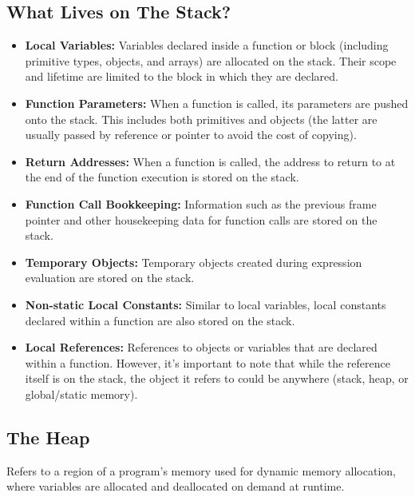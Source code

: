 \documentclass{report}
\begin{document}
    \bigbreak \noindent 
    \subsection{What Lives on The Stack?}
    \bigbreak \noindent 
    \begin{itemize}
        \item \textbf{Local Variables:} Variables declared inside a function or block (including primitive types, objects, and arrays) are allocated on the stack. Their scope and lifetime are limited to the block in which they are declared.
        \item \textbf{Function Parameters:} When a function is called, its parameters are pushed onto the stack. This includes both primitives and objects (the latter are usually passed by reference or pointer to avoid the cost of copying).
        \item \textbf{Return Addresses:} When a function is called, the address to return to at the end of the function execution is stored on the stack.
        \item \textbf{Function Call Bookkeeping:} Information such as the previous frame pointer and other housekeeping data for function calls are stored on the stack.
        \item \textbf{Temporary Objects:} Temporary objects created during expression evaluation are stored on the stack.
        \item \textbf{Non-static Local Constants:} Similar to local variables, local constants declared within a function are also stored on the stack.
        \item \textbf{Local References:} References to objects or variables that are declared within a function. However, it's important to note that while the reference itself is on the stack, the object it refers to could be anywhere (stack, heap, or global/static memory).
    \end{itemize}

    \bigbreak \noindent 

    \pagebreak 
    \subsection{The Heap}
    \bigbreak \noindent 
    \begin{concept}
        Refers to a region of a program's memory used for dynamic memory allocation, where variables are allocated and deallocated on demand at runtime. 
    \end{concept}
    \bigbreak \noindent 
\end{document}
